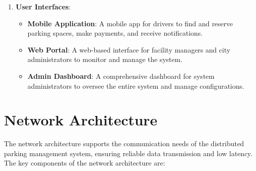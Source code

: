 \documentclass[oneside, 12pt, a4paper, draft]{book}
\begin{document}
\begin{enumerate}
\item \textbf{\textbf{User Interfaces}}:
\begin{itemize}
\item \textbf{\textbf{Mobile Application}}: A mobile app for drivers to find and reserve parking spaces, make payments, and receive notifications.
\item \textbf{\textbf{Web Portal}}: A web-based interface for facility managers and city administrators to monitor and manage the system.
\item \textbf{\textbf{Admin Dashboard}}: A comprehensive dashboard for system administrators to oversee the entire system and manage configurations.
\end{itemize}
\end{enumerate}
\section{Network Architecture}
\label{sec:orgc797047}
The network architecture supports the communication needs of the distributed parking management system, ensuring reliable data transmission and low latency. The key components of the network architecture are:
\end{document}
